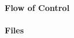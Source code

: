 \paragraph{Flow of Control}
\begin{itemize}
\end{itemize}

\paragraph{Files}
\begin{itemize}
\end{itemize}